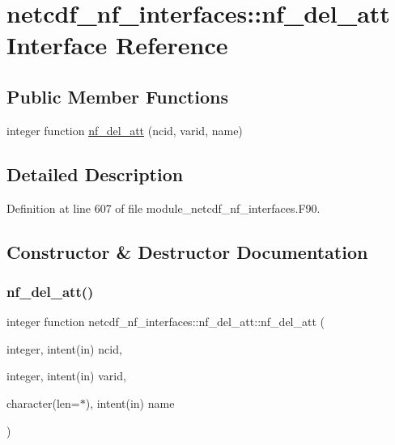 \hypertarget{interfacenetcdf__nf__interfaces_1_1nf__del__att}{}\section{netcdf\+\_\+nf\+\_\+interfaces\+:\+:nf\+\_\+del\+\_\+att Interface Reference}
\label{interfacenetcdf__nf__interfaces_1_1nf__del__att}
\subsection*{Public Member Functions}
\begin{DoxyCompactItemize}
\item 
integer function \hyperlink{interfacenetcdf__nf__interfaces_1_1nf__del__att_a2cdf162cea2366220ac57011664bce45}{nf\+\_\+del\+\_\+att} (ncid, varid, name)
\end{DoxyCompactItemize}


\subsection{Detailed Description}


Definition at line 607 of file module\+\_\+netcdf\+\_\+nf\+\_\+interfaces.\+F90.



\subsection{Constructor \& Destructor Documentation}
\mbox{\label{interfacenetcdf__nf__interfaces_1_1nf__del__att_a2cdf162cea2366220ac57011664bce45}} 
\subsubsection{\texorpdfstring{nf\+\_\+del\+\_\+att()}{nf\_del\_att()}}
{\footnotesize\ttfamily integer function netcdf\+\_\+nf\+\_\+interfaces\+::nf\+\_\+del\+\_\+att\+::nf\+\_\+del\+\_\+att (\begin{DoxyParamCaption}\item[{integer, intent(in)}]{ncid,  }\item[{integer, intent(in)}]{varid,  }\item[{character(len=$\ast$), intent(in)}]{name }\end{DoxyParamCaption})}



